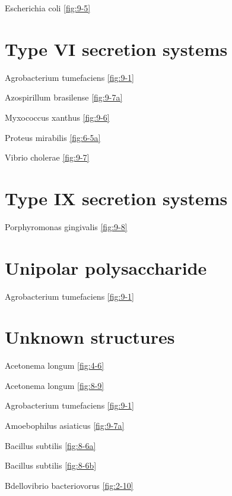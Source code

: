 \documentclass[]{tufte-book}
\begin{document}
Escherichia coli \ref{fig:9-5}

\hypertarget{type-vi-secretion-systems}{%
\section*{Type VI secretion systems}\label{type-vi-secretion-systems}}

Agrobacterium tumefaciens \ref{fig:9-1}

Azospirillum brasilense \ref{fig:9-7a}

Myxococcus xanthus \ref{fig:9-6}

Proteus mirabilis \ref{fig:6-5a}

Vibrio cholerae \ref{fig:9-7}

\hypertarget{type-ix-secretion-systems}{%
\section*{Type IX secretion systems}\label{type-ix-secretion-systems}}

Porphyromonas gingivalis \ref{fig:9-8}

\hypertarget{unipolar-polysaccharide}{%
\section*{Unipolar polysaccharide}\label{unipolar-polysaccharide}}

Agrobacterium tumefaciens \ref{fig:9-1}

\hypertarget{unknown-structures}{%
\section*{Unknown structures}\label{unknown-structures}}

Acetonema longum \ref{fig:4-6}

Acetonema longum \ref{fig:8-9}

Agrobacterium tumefaciens \ref{fig:9-1}

Amoebophilus asiaticus \ref{fig:9-7a}

Bacillus subtilis \ref{fig:8-6a}

Bacillus subtilis \ref{fig:8-6b}

Bdellovibrio bacteriovorus \ref{fig:2-10}
\end{document}
